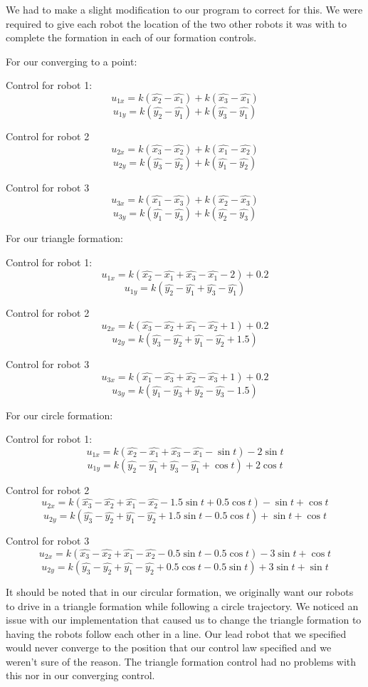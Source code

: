 \documentclass[12pt]{article}
\begin{document}
We had to make a slight modification to our program to correct for this. We were required to give each robot the location of the two other robots it was with to complete the formation in each of our formation controls.

For our converging to a point:

Control for robot 1:
\[ u_{1x} = k(\hat{x_2} - \hat{x_1}) + k(\hat{x_3} - \hat{x_1}) \]
\[ u_{1y} = k(\hat{y_2} - \hat{y_1}) + k(\hat{y_3} - \hat{y_1}) \]
 
Control for robot 2
\[ u_{2x} = k(\hat{x_3} - \hat{x_2}) + k(\hat{x_1} - \hat{x_2}) \]
\[ u_{2y} = k(\hat{y_3} - \hat{y_2}) + k(\hat{y_1} - \hat{y_2}) \]
 
Control for robot 3
\[ u_{3x} = k(\hat{x_1} - \hat{x_3}) + k(\hat{x_2} - \hat{x_3}) \]
\[ u_{3y} = k(\hat{y_1} - \hat{y_3}) + k(\hat{y_2} - \hat{y_3}) \]

For our triangle formation:

Control for robot 1:
\[ u_{1x} = k(\hat{x_2} - \hat{x_1} + \hat{x_3} - \hat{x_1} - 2) + 0.2 \]
\[ u_{1y} = k(\hat{y_2} - \hat{y_1} + \hat{y_3} - \hat{y_1})		   \]
 
Control for robot 2
\[ u_{2x} = k(\hat{x_3} - \hat{x_2} + \hat{x_1} - \hat{x_2} + 1) + 0.2 \]
\[ u_{2y} = k(\hat{y_3} - \hat{y_2} + \hat{y_1} - \hat{y_2} + 1.5)	   \]
 
Control for robot 3
\[ u_{3x} = k(\hat{x_1} - \hat{x_3} + \hat{x_2} - \hat{x_3} + 1) + 0.2 \]
\[ u_{3y} = k(\hat{y_1} - \hat{y_3} + \hat{y_2} - \hat{y_3} - 1.5)	   \]


For our circle formation:

Control for robot 1:
\[ u_{1x} = k(\hat{x_2} - \hat{x_1} + \hat{x_3} - \hat{x_1} - \sin t) - 2\sin t \]
\[ u_{1y} = k(\hat{y_2} - \hat{y_1} + \hat{y_3} - \hat{y_1} + \cos t) + 2\cos t \]
 
Control for robot 2
\[ u_{2x} = k(\hat{x_3} - \hat{x_2} + \hat{x_1} - \hat{x_2} - 1.5\sin t + 0.5\cos t) - \sin t + \cos t	\]
\[ u_{2y} = k(\hat{y_3} - \hat{y_2} + \hat{y_1} - \hat{y_2} + 1.5\sin t - 0.5\cos t) + \sin t + \cos t  \]
 
Control for robot 3
\[ u_{2x} = k(\hat{x_3} - \hat{x_2} + \hat{x_1} - \hat{x_2} - 0.5\sin t - 0.5\cos t) - 3\sin t + \cos t	\]
\[ u_{2y} = k(\hat{y_3} - \hat{y_2} + \hat{y_1} - \hat{y_2} + 0.5\cos t - 0.5\sin t) + 3\sin t + \sin t  \]


It should be noted that in our circular formation, we originally want our robots to drive in a triangle formation while following a circle trajectory. We noticed an issue with our implementation that caused us to change the triangle formation to having the robots follow each other in a line. Our lead robot that we specified would never converge to the position that our control law specified and we weren't sure of the reason. The triangle formation control had no problems with this nor in our converging control.
\end{document}
